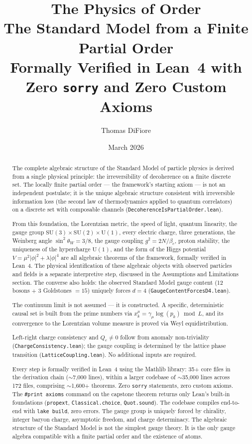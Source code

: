 \documentclass[11pt,letterpaper]{article}
\title{\textbf{The Physics of Order}\\[6pt]
  \large The Standard Model from a Finite Partial Order\\[4pt]
  \normalsize Formally Verified in Lean~4 with Zero \texttt{sorry}
  and Zero Custom Axioms}
\author{Thomas DiFiore}
\date{March 2026}
\begin{document}
\maketitle

\begin{abstract}
The complete algebraic structure of the Standard Model of particle
physics is derived from a single physical principle: the
irreversibility of decoherence on a finite discrete set.  The
locally finite partial order --- the framework's starting
axiom --- is not an independent postulate; it is the unique
algebraic structure consistent with irreversible information loss
(the second law of thermodynamics applied to quantum correlators)
on a discrete set with composable channels
(\texttt{DecoherenceIsPartialOrder.lean}).

From this foundation, the Lorentzian metric, the speed
of light, quantum linearity, the gauge group $\mathrm{SU}(3) \times
\mathrm{SU}(2) \times \mathrm{U}(1)$, every electric charge, three
generations, the Weinberg angle $\sin^2\theta_W = 3/8$, the gauge
coupling $g^2 = 2N/\beta_c$, proton stability, the uniqueness of
the hypercharge $\mathrm{U}(1)$, and the form of the Higgs potential
$V = \mu^2|\phi|^2 + \lambda|\phi|^4$ are all algebraic theorems
of the framework, formally verified in Lean~4.
The physical identification of these algebraic objects with
observed particles and fields is a separate interpretive step,
discussed in the Assumptions and Limitations section.
The converse also holds: the observed Standard Model gauge content
(12 bosons $+$ 3 Goldstones $= 15$) uniquely forces $d = 4$
(\texttt{GaugeContentForcesD4.lean}).

The continuum limit is not assumed --- it is constructed.  A specific,
deterministic causal set is built from the prime numbers via
$x^\mu_k = \gamma_\mu \log(p_k) \bmod L$, and its convergence to
the Lorentzian volume measure is proved via Weyl equidistribution.

Left-right charge consistency and $Q_e \neq 0$ follow from anomaly
non-triviality (\texttt{Charge\-Consistency.lean}); the gauge coupling
is determined by the lattice phase transition
(\texttt{Lattice\-Coupling.lean}).  No additional inputs are required.

Every step is formally verified in Lean~4 using the Mathlib library:
35+ core files in the derivation chain ($\sim$7{,}000 lines), within a
larger codebase of $\sim$35{,}000 lines across 172 files, comprising
$\sim$1{,}600+ theorems.
Zero \texttt{sorry} statements, zero
custom axioms.  The \texttt{\#print axioms} command on the capstone
theorem returns only Lean's built-in foundations (\texttt{propext},
\texttt{Classical.choice}, \texttt{Quot.sound}).  The codebase
compiles end-to-end with \texttt{lake build}, zero
errors.  The gauge group is uniquely
forced by chirality, integer baryon charge, asymptotic freedom, and
charge determinacy.  The algebraic structure of the Standard Model
is not the simplest gauge theory.  It is the only gauge algebra
compatible with a finite partial order and the existence of atoms.
\end{abstract}
\end{document}
